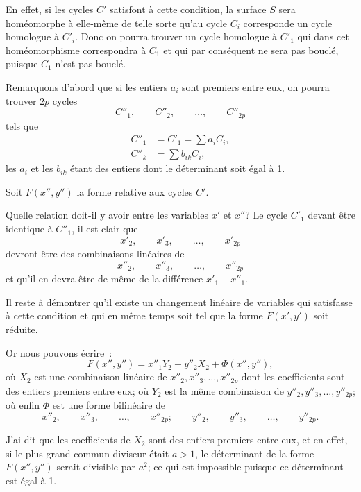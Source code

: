\documentclass{article}
\begin{document}
En effet, si les cycles $C'$ satisfont à cette condition, la surface $S$ sera homéomorphe à elle-même de telle sorte qu'au cycle $C_{i}$ corresponde un cycle homologue à $C'_{i}$. Donc on pourra trouver un cycle homologue à $C'_{1}$ qui dans cet homéomorphisme correspondra à $C_{1}$ et qui par conséquent ne sera pas bouclé, puisque $C_{1}$ n'est pas bouclé.

Remarquons d'abord que si les entiers $a_{i}$ sont premiers entre eux, on pourra trouver $2p$ cycles
\[ C''_{1}, \qquad C''_{2}, \qquad \ldots, \qquad C''_{2p} \]
tels que
\[ \begin{aligned} C''_{1} &= C'_{1} = \sum a_{i} C_{i}, \\ C''_{k} &= \sum b_{ik} C_{i}, \end{aligned} \]
les $a_{i}$ et les $b_{ik}$ étant des entiers dont le déterminant soit égal à 1.

Soit $F(x'', y'')$ la forme relative aux cycles $C'$.

Quelle relation doit-il y avoir entre les variables $x'$ et $x''$? Le cycle $C'_{1}$ devant être identique à $C''_{1}$, il est clair que
\[ x'_{2}, \qquad x'_{3}, \qquad \ldots, \qquad x'_{2p} \]
devront être des combinaisons linéaires de
\[ x''_{2}, \qquad x''_{3}, \qquad \ldots, \qquad x''_{2p} \]
et qu'il en devra être de même de la différence $x'_{1} - x''_{1}$.

Il reste à démontrer qu'il existe un changement linéaire de variables qui satisfasse à cette condition et qui en même temps soit tel que la forme $F(x', y')$ soit réduite.

Or nous pouvons écrire~:
\[ F(x'', y'') = x''_{1} Y_{2} - y''_{2} X_{2} + \Phi(x'', y''), \]
où $X_{2}$ est une combinaison linéaire de $x''_{2}, x''_{3}, \ldots, x''_{2p}$ dont les coefficients sont des entiers premiers entre eux; où $Y_{2}$ est la même combinaison de $y''_{2}, y''_{3}, \ldots, y''_{2p}$; où enfin $\Phi$ est une forme bilinéaire de
\[ x''_{2}, \qquad x''_{3}, \qquad \ldots, \qquad x''_{2p}; \qquad y''_{2}, \qquad y''_{3}, \qquad \ldots, \qquad y''_{2p}. \]

J'ai dit que les coefficients de $X_{2}$ sont des entiers premiers entre eux, et en effet, si le plus grand commun diviseur était $a > 1$, le déterminant de la forme $F(x'', y'')$ serait divisible par $a^{2}$; ce qui est impossible puisque ce déterminant est égal à 1.
\end{document}
